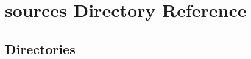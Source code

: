 \section{sources Directory Reference}
\label{dir_08d237fc27d4ecd563f71c5d52f2fecc}
\subsection*{Directories}
\begin{DoxyCompactItemize}
\end{DoxyCompactItemize}
